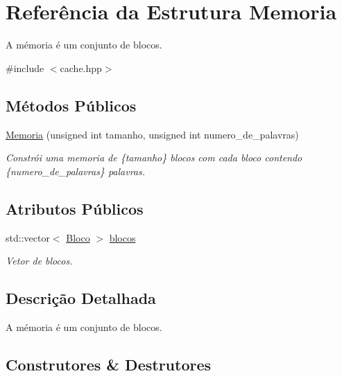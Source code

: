 \hypertarget{structMemoria}{}\section{Referência da Estrutura Memoria}
\label{structMemoria}


A mémoria é um conjunto de blocos.  




{\ttfamily \#include $<$cache.\+hpp$>$}

\subsection*{Métodos Públicos}
\begin{DoxyCompactItemize}
\item 
\hyperlink{structMemoria_aacd10b6010e4839a83a260a59996161c}{Memoria} (unsigned int tamanho, unsigned int numero\+\_\+de\+\_\+palavras)
\begin{DoxyCompactList}\small\item\em Constrói uma memoria de \{tamanho\} blocos com cada bloco contendo \{numero\+\_\+de\+\_\+palavras\} palavras. \end{DoxyCompactList}\end{DoxyCompactItemize}
\subsection*{Atributos Públicos}
\begin{DoxyCompactItemize}
\item 
\mbox{\label{structMemoria_a63701165b1d3d472685c47a7c2ad35ff}} 
std\+::vector$<$ \hyperlink{structBloco}{Bloco} $>$ \hyperlink{structMemoria_a63701165b1d3d472685c47a7c2ad35ff}{blocos}
\begin{DoxyCompactList}\small\item\em Vetor de blocos. \end{DoxyCompactList}\end{DoxyCompactItemize}


\subsection{Descrição Detalhada}
A mémoria é um conjunto de blocos. 

\subsection{Construtores \& Destrutores}
\mbox{\label{structMemoria_aacd10b6010e4839a83a260a59996161c}} 
